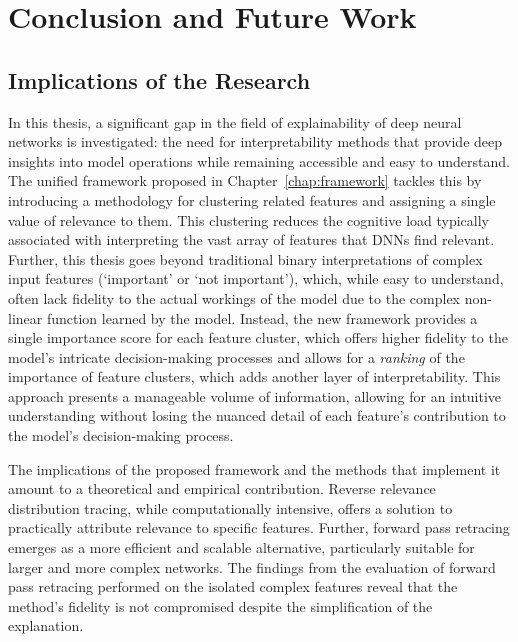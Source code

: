 \chapter{Conclusion and Future Work}
\label{chapter:conclusion}
\section{Implications of the Research}
In this thesis, a significant gap in the field of explainability of deep neural networks is investigated: the need for interpretability methods that provide deep insights into model operations while remaining accessible and easy to understand. The unified framework proposed in Chapter~\ref{chap:framework} tackles this by introducing a methodology for clustering related features and assigning a single value of relevance to them. This clustering reduces the cognitive load typically associated with interpreting the vast array of features that DNNs find relevant. Further, this thesis goes beyond traditional binary interpretations of complex input features (`important' or `not important'), which, while easy to understand, often lack fidelity to the actual workings of the model due to the complex non-linear function learned by the model. Instead, the new framework provides a single importance score for each feature cluster, which offers higher fidelity to the model's intricate decision-making processes and allows for a \emph{ranking} of the importance of feature clusters, which adds another layer of interpretability. This approach presents a manageable volume of information, allowing for an intuitive understanding without losing the nuanced detail of each feature's contribution to the model's decision-making process.

The implications of the proposed framework and the methods that implement it amount to a theoretical and empirical contribution. Reverse relevance distribution tracing, while computationally intensive, offers a solution to practically attribute relevance to specific features. Further, forward pass retracing emerges as a more efficient and scalable alternative, particularly suitable for larger and more complex networks. The findings from the evaluation of forward pass retracing performed on the isolated complex features reveal that the method's fidelity is not compromised despite the simplification of the explanation. 

